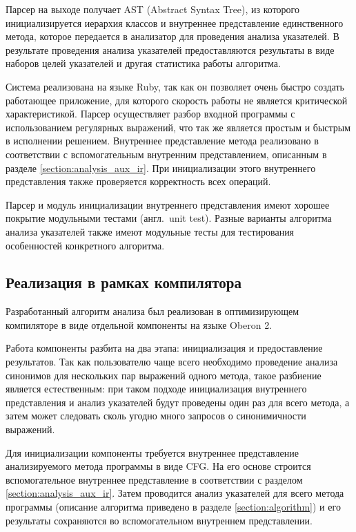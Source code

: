 \documentclass[14pt,titlepage]{extarticle}
\newcommand{\eng}[1]{{\English#1}}
\newcommand{\engdef}[1]{(англ.~\eng{#1})}
\begin{document}
      Парсер на выходе получает AST (\eng{Abstract Syntax Tree}), из которого
      инициализируется иерархия классов и внутреннее представление
      единственного метода, которое передается в анализатор для проведения
      анализа указателей. В результате проведения анализа указателей
      предоставляются результаты в виде наборов целей указателей и другая
      статистика работы алгоритма.

      Система реализована на языке \eng{Ruby}, так как он позволяет очень
      быстро создать работающее приложение, для которого скорость работы не
      является критической характеристикой. Парсер осуществляет разбор входной
      программы с использованием регулярных выражений, что так же является
      простым и быстрым в исполнении решением. Внутреннее представление метода
      реализовано в соответствии с вспомогательным внутренним представлением,
      описанным в разделе \ref{section:analysis_aux_ir}.
      При инициализации этого внутреннего представления также проверяется
      корректность всех операций.

      Парсер и модуль инициализации внутреннего представления имеют хорошее
      покрытие модульными тестами \engdef{unit test}. Разные варианты
      алгоритма анализа указателей также имеют модульные тесты для тестирования
      особенностей конкретного алгоритма.

    \subsection{Реализация в рамках компилятора}

      Разработанный алгоритм анализа был реализован в оптимизирующем
      компиляторе в виде отдельной компоненты на языке \eng{Oberon} 2.

      Работа компоненты разбита на два этапа: инициализация и предоставление
      результатов. Так как пользователю чаще всего необходимо проведение
      анализа синонимов для нескольких пар выражений одного метода, такое
      разбиение является естественным: при таком подходе инициализация
      внутреннего представления и анализ указателей будут проведены один раз
      для всего метода, а затем может следовать сколь угодно много запросов о
      синонимичности выражений.

      Для инициализации компоненты требуется внутреннее представление
      анализируемого метода программы в виде CFG. На его основе строится
      вспомогательное внутреннее представление в соответствии с разделом
      \ref{section:analysis_aux_ir}. Затем проводится анализ указателей для
      всего метода программы (описание алгоритма приведено в разделе
      \ref{section:algorithm}) и его результаты сохраняются во вспомогательном
      внутреннем представлении.
\end{document}
